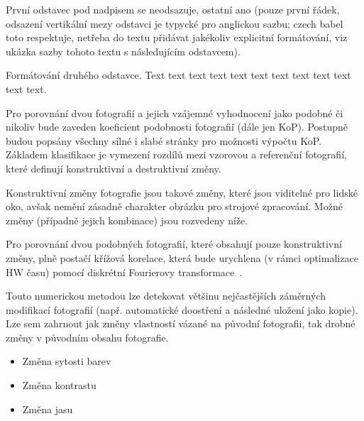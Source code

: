 
První odstavec pod nadpisem se neodsazuje, ostatní ano (pouze první řádek, odsazení vertikální mezy odstavci je typycké pro anglickou sazbu; czech babel toto respektuje, netřeba do textu přidávat jakékoliv explicitní formátování, viz ukázka sazby tohoto textu s následujícím odstavcem).

Formátování druhého odstavce. Text text text text text text text text text text text text.



Pro porovnání dvou fotografií a jejich vzájemné vyhodnocení jako podobné či nikoliv bude zaveden koeficient podobnosti fotografií (dále jen KoP). Postupně budou popsány všechny silné i slabé stránky pro možnosti výpočtu KoP. Základem klasifikace je vymezení rozdílů mezi vzorovou a referenční fotografií, které definují konstruktivní a destruktivní změny.

Konstruktivní změny fotografie jsou takové změny, které jsou viditelné pro lidské oko, avšak nemění zásadně charakter obrázku pro strojové zpracování. Možné změny (případně jejich kombinace) jsou rozvedeny níže.

Pro porovnání dvou podobných fotografií, které obsahují pouze konstruktivní změny, plně postačí křížová korelace, která bude urychlena (v rámci optimalizace HW času) pomocí diskrétní Fourierovy transformace~\cite{FFT}.

Touto numerickou metodou lze detekovat většinu nejčastějších záměrných modifikací fotografií (např. automatické doostření a následné uložení jako kopie). Lze sem zahrnout jak změny vlastností vázané na původní fotografii, tak drobné změny v původním obsahu fotografie.

\begin{itemize}
	\setlength{\parskip}{0pt}
	\setlength{\itemsep}{0pt}
	\item{Změna sytosti barev}
	\item{Změna kontrastu}
	\item{Změna jasu}
\end{itemize}


